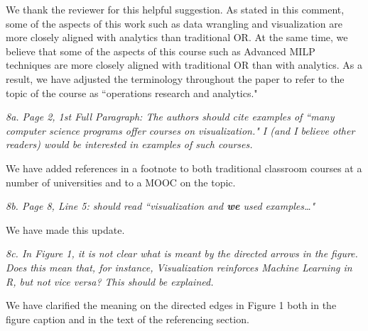 \documentclass[12pt, letterpaper]{article}
\begin{document}
We thank the reviewer for this helpful suggestion. As stated in this comment, some of the aspects of this work such as data wrangling and visualization are more closely aligned with analytics than traditional OR. At the same time, we believe that some of the aspects of this course such as Advanced MILP techniques are more closely aligned with traditional OR than with analytics. As a result, we have adjusted the terminology throughout the paper to refer to the topic of the course as ``operations research and analytics."

\vspace{0.5cm}

\noindent\textit{8a. Page 2, 1st Full Paragraph: The authors should cite examples of ``many computer science programs offer courses on visualization." I (and I believe other readers) would be interested in examples of such courses.}

We have added references in a footnote to both traditional classroom courses at a number of universities and to a MOOC on the topic.

\vspace{0.5cm}

\noindent\textit{8b. Page 8, Line 5: should read ``visualization and \textbf{we} used examples\ldots"}

We have made this update.

\vspace{0.5cm}

\noindent\textit{8c. In Figure 1, it is not clear what is meant by the directed arrows in the figure. Does this mean that, for instance, Visualization reinforces Machine Learning in R, but not vice versa? This should be explained.}

We have clarified the meaning on the directed edges in Figure 1 both in the figure caption and in the text of the referencing section.
\end{document}

